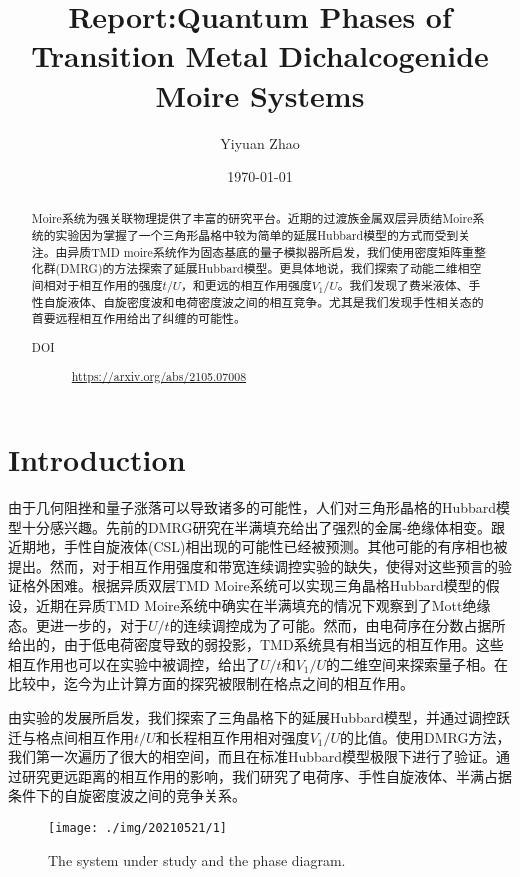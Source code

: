\documentclass[reprint, aps, prb, showkeys]{revtex4-2}
\begin{document}
\title{Report:Quantum Phases of Transition Metal Dichalcogenide Moire Systems}

\author{Yiyuan Zhao}
\date{\today}

\begin{abstract}
Moire系统为强关联物理提供了丰富的研究平台。近期的过渡族金属双层异质结Moire系统的实验因为掌握了一个三角形晶格中较为简单的延展Hubbard模型的方式而受到关注。由异质TMD moire系统作为固态基底的量子模拟器所启发，我们使用密度矩阵重整化群(DMRG)的方法探索了延展Hubbard模型。更具体地说，我们探索了动能二维相空间相对于相互作用的强度$t/U$，和更远的相互作用强度$V_1/U$。我们发现了费米液体、手性自旋液体、自旋密度波和电荷密度波之间的相互竞争。尤其是我们发现手性相关态的首要远程相互作用给出了纠缠的可能性。
\begin{description}
    \item[DOI] \url{https://arxiv.org/abs/2105.07008}
\end{description}
\end{abstract}


\maketitle

\section{Introduction}
由于几何阻挫和量子涨落可以导致诸多的可能性，人们对三角形晶格的Hubbard模型十分感兴趣。先前的DMRG研究在半满填充给出了强烈的金属-绝缘体相变。跟近期地，手性自旋液体(CSL)相出现的可能性已经被预测。其他可能的有序相也被提出。然而，对于相互作用强度和带宽连续调控实验的缺失，使得对这些预言的验证格外困难。根据异质双层TMD Moire系统可以实现三角晶格Hubbard模型的假设，近期在异质TMD Moire系统中确实在半满填充的情况下观察到了Mott绝缘态。更进一步的，对于$U/t$的连续调控成为了可能。然而，由电荷序在分数占据所给出的，由于低电荷密度导致的弱投影，TMD系统具有相当远的相互作用。这些相互作用也可以在实验中被调控，给出了$U/t$和$V_1/U$的二维空间来探索量子相。在比较中，迄今为止计算方面的探究被限制在格点之间的相互作用。

由实验的发展所启发，我们探索了三角晶格下的延展Hubbard模型，并通过调控跃迁与格点间相互作用$t/U$和长程相互作用相对强度$V_1/U$的比值。使用DMRG方法，我们第一次遍历了很大的相空间，而且在标准Hubbard模型极限下进行了验证。通过研究更远距离的相互作用的影响，我们研究了电荷序、手性自旋液体、半满占据条件下的自旋密度波之间的竞争关系。
\begin{figure}[t]
    \texttt{[image: ./img/20210521/1]}
    \caption{\label{fig:phaseDiagram} 
    The system under study and the phase diagram.
    }
\end{figure}
\end{document}
